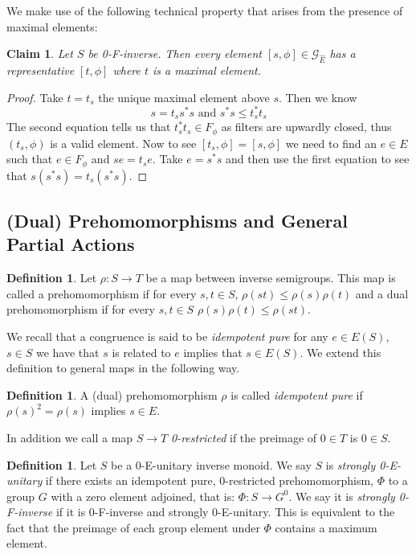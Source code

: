 \documentclass[11pt]{amsart}
\theoremstyle{plain}
\newtheorem{claim}[theorem]{Claim}%
\theoremstyle{definition}%
\newtheorem{definition}[theorem]{Definition}%
\theoremstyle{remark}%
\newcommand{\G}{\mathcal{G}}
\newcommand{\E}{\widehat{E}}
\begin{document}
We make use of the following technical property that arises from the presence of maximal elements:

\begin{claim}\label{Claim:C1}
Let $S$ be 0-F-inverse. Then every element $[s,\phi] \in \G_{\E}$ has a representative $[t,\phi]$ where $t$ is a maximal element.
\end{claim}
\begin{proof}
Take $t=t_{s}$ the unique maximal element above $s$. Then we know 
\begin{equation*}
s = t_{s}s^{*}s \mbox{ and } s^{*}s \leq t_{s}^{*}t_{s}
\end{equation*} 
The second equation tells us that $t_{s}^{*}t_{s} \in F_{\phi}$ as filters are upwardly closed, thus $(t_{s},\phi)$ is a valid element. Now to see $[t_{s},\phi]=[s,\phi]$ we need to find an $e \in E$ such that $e \in F_{\phi}$ and $se=t_{s}e$. Take $e=s^{*}s$ and then use the first equation to see that $s(s^{*}s)=t_{s}(s^{*}s)$.
\end{proof}

\subsection{(Dual) Prehomomorphisms and General Partial Actions}\label{Sect:S3}
\begin{definition}
Let $\rho: S \rightarrow T$ be a map between inverse semigroups. This map is called a prehomomorphism if for every $s,t \in S$, $\rho(st) \leq \rho(s)\rho(t)$ and a dual prehomomorphism if for every $s,t \in S$ $\rho(s)\rho(t) \leq \rho(st)$.
\end{definition}

We recall that a congruence is said to be \textit{idempotent pure} for any $e \in E(S)$, $s \in S$ we have that $s$ is related to $e$ implies that $s \in E(S)$. We extend this definition to general maps in the following way.
\begin{definition}
A (dual) prehomomorphism $\rho$ is called \textit{idempotent pure} if $\rho(s)^{2}=\rho(s)$ implies $s \in E$.  
\end{definition}
In addition we call a map $S \rightarrow T$ \textit{0-restricted} if the preimage of $0 \in T$ is $0 \in S$.

\begin{definition}
Let $S$ be a 0-E-unitary inverse monoid. We say $S$ is \textit{strongly 0-E-unitary} if there exists an idempotent pure, 0-restricted prehomomorphism, $\Phi$ to a group $G$ with a zero element adjoined, that is: $\Phi:S \rightarrow G^{0}$. We say it is \textit{strongly 0-F-inverse} if it is 0-F-inverse and strongly 0-E-unitary. This is equivalent to the fact that the preimage of each group element under $\Phi$ contains a maximum element.
\end{definition}
\end{document}
